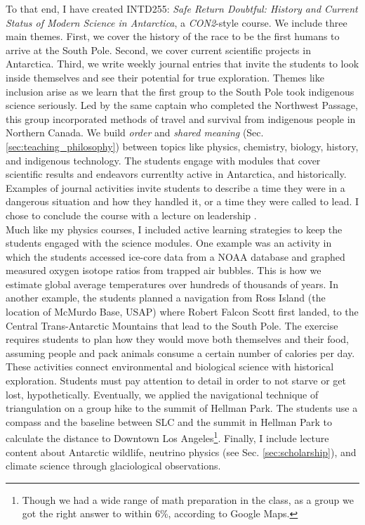 \documentclass[../../../main.tex]{subfiles}
\begin{document}
To that end, I have created INTD255: \textit{Safe Return Doubtful: History and Current Status of Modern Science in Antarctica}, a \textit{CON2}-style course.  We include three main themes. First, we cover the history of the race to be the first humans to arrive at the South Pole.  Second, we cover current scientific projects in Antarctica.  Third, we write weekly journal entries that invite the students to look inside themselves and see their potential for true exploration.  Themes like inclusion arise as we learn that the first group to the South Pole took indigenous science seriously.  Led by the same captain who completed the Northwest Passage, this group incorporated methods of travel and survival from indigenous people in Northern Canada.  We build \textit{order} and \textit{shared meaning} (Sec. \ref{sec:teaching_philosophy}) between topics like physics, chemistry, biology, history, and indigenous technology.  The students engage with modules that cover scientific results and endeavors currentlty active in Antarctica, and historically.  Examples of journal activities invite students to describe a time they were in a dangerous situation and how they handled it, or a time they were called to lead.  I chose to conclude the course with a lecture on leadership \cite{west_point}.
\\
\vspace{0.25cm}
Much like my physics courses, I included active learning strategies to keep the students engaged with the science modules.  One example was an activity in which the students accessed ice-core data from a NOAA database and graphed measured oxygen isotope ratios from trapped air bubbles.  This is how we estimate global average temperatures over hundreds of thousands of years.  In another example, the students planned a navigation from Ross Island (the location of McMurdo Base, USAP) where Robert Falcon Scott first landed, to the Central Trans-Antarctic Mountains that lead to the South Pole.  The exercise requires students to plan how they would move both themselves and their food, assuming people and pack animals consume a certain number of calories per day.  These activities connect environmental and biological science with historical exploration.  Students must pay attention to detail in order to not starve or get lost, hypothetically.  Eventually, we applied the navigational technique of triangulation on a group hike to the summit of Hellman Park.  The students use a compass and the baseline between SLC and the summit in Hellman Park to calculate the distance to Downtown Los Angeles\footnote{Though we had a wide range of math preparation in the class, as a group we got the right answer to within 6\%, according to Google Maps.}.  Finally, I include lecture content about Antarctic wildlife, neutrino physics (see Sec. \ref{sec:scholarship}), and climate science through glaciological observations.
\end{document}
